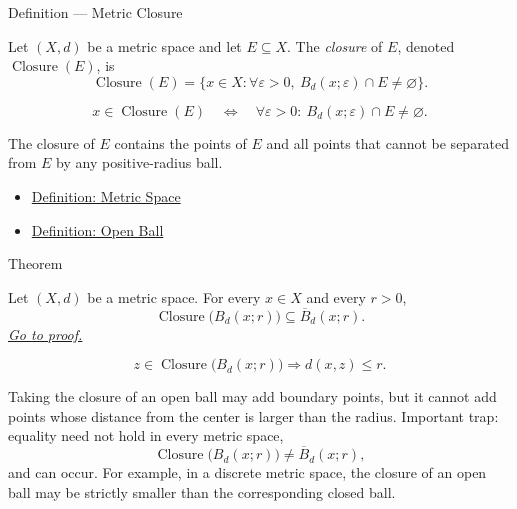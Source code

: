 \begin{definitionbox}{Definition --- Metric Closure}
\begin{definition}\label{def:metric-closure}
Let \((X,d)\) be a metric space and let \(E\subseteq X\).  The
\emph{closure} of \(E\), denoted \(\operatorname{Closure}(E)\), is
\[
  \operatorname{Closure}(E)
  =
  \{x\in X:\forall\varepsilon>0,\ B_d(x;\varepsilon)\cap E\neq\varnothing\}.
\]
\end{definition}
\end{definitionbox}

\begin{remark*}
\[
x\in\operatorname{Closure}(E)
\quad\Longleftrightarrow\quad
\forall\varepsilon>0{:}\ B_d(x;\varepsilon)\cap E\neq\varnothing.
\]
\end{remark*}

\begin{remark*}[Interpretation]
The closure of \(E\) contains the points of \(E\) and all points that cannot
be separated from \(E\) by any positive-radius ball.
\end{remark*}

\begin{dependencies}
\begin{itemize}
  \item \hyperref[def:metric-space]{Definition: Metric Space}
  \item \hyperref[def:metric-open-ball]{Definition: Open Ball}
\end{itemize}
\end{dependencies}

\begin{theorembox}{Theorem}
\begin{theorem}
\label{thm:metric-closure-open-ball-contained-closed-ball}
Let \((X,d)\) be a metric space.  For every \(x\in X\) and every \(r>0\),
\[
  \operatorname{Closure}\bigl(B_d(x;r)\bigr)\subseteq \overline{B}_d(x;r).
\]
\hyperref[prf:metric-closure-open-ball-contained-closed-ball]{\textit{Go to proof.}}
\end{theorem}
\end{theorembox}

\begin{remark*}
\[
z\in \operatorname{Closure}\bigl(B_d(x;r)\bigr)
\Longrightarrow
d(x,z)\leq r.
\]
\end{remark*}

\begin{remark*}[Interpretation]
Taking the closure of an open ball may add boundary points, but it cannot add
points whose distance from the center is larger than the radius.  Important
trap: equality need not hold in every metric space,
\[
  \operatorname{Closure}\bigl(B_d(x;r)\bigr)\neq \overline{B}_d(x;r),
\]
and can occur.  For example, in a discrete metric space, the closure of an
open ball may be strictly smaller than the corresponding closed ball.
\end{remark*}

